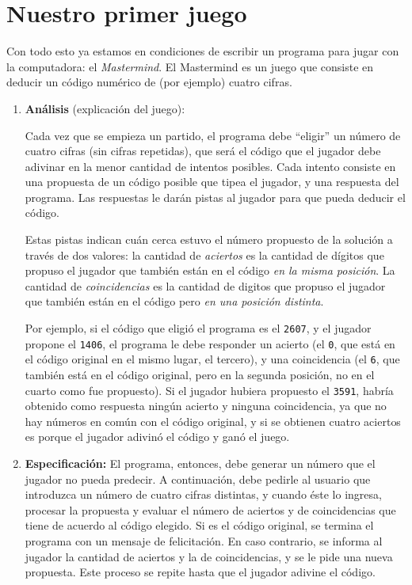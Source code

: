 \section{Nuestro primer juego}

Con todo esto ya estamos en condiciones de escribir un programa para jugar con
la computadora: el \emph{Mastermind}. El Mastermind es un juego que consiste en
deducir un código numérico de (por ejemplo) cuatro cifras.

\begin{enumerate}

\item {\bf Análisis } (explicación del juego):

Cada vez que se empieza un partido, el programa debe ``eligir'' un número de
cuatro cifras (sin cifras repetidas), que será el código que el jugador debe
adivinar en la menor cantidad de intentos posibles. Cada intento consiste en
una propuesta de un código posible que tipea el jugador, y una respuesta del
programa. Las respuestas le darán pistas al jugador para que pueda deducir el
código.

Estas pistas indican cuán cerca estuvo el número propuesto de la solución a
través de dos valores: la cantidad de \emph{aciertos} es la cantidad de
dígitos que propuso el jugador que también están en el código \emph{en la
misma posición}. La cantidad de \emph{coincidencias} es la cantidad de
digitos que propuso el jugador que también están en el código pero \emph{en
una posición distinta}.

Por ejemplo, si el código que eligió el programa es el \lstinline!2607!, y el
jugador propone el \lstinline!1406!, el programa le debe responder un acierto (el
\lstinline!0!, que está en el código original en el mismo lugar, el tercero), y
una coincidencia (el \lstinline!6!, que también está en el código original, pero
en la segunda posición, no en el cuarto como fue propuesto). Si el jugador
hubiera propuesto el \lstinline!3591!, habría obtenido como respuesta ningún
acierto y ninguna coincidencia, ya que no hay números en común con el
código original, y si se obtienen cuatro aciertos es porque el jugador
adivinó el código y ganó el juego.

\item {\bf Especificación: }
El programa, entonces, debe generar un número que el jugador no pueda predecir.
A continuación, debe pedirle al usuario que introduzca un número de cuatro
cifras distintas, y cuando éste lo ingresa, procesar la propuesta y evaluar el
número de aciertos y de coincidencias que tiene de acuerdo al código elegido. Si
es el código original, se termina el programa con un mensaje de felicitación. En
caso contrario, se informa al jugador la cantidad de aciertos y la de
coincidencias, y se le pide una nueva propuesta. Este proceso se repite hasta
que el jugador adivine el código.


\end{enumerate}

